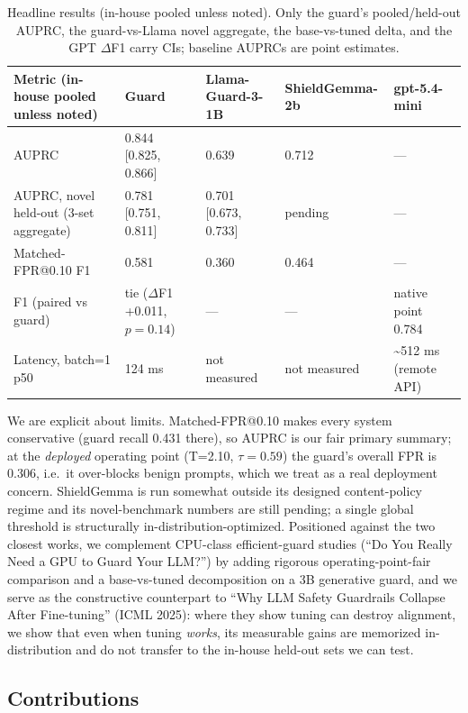 \documentclass[sigconf,nonacm]{acmart}
\begin{document}
\begin{table}[t]
  \centering
  \small
  \caption{Headline results (in-house pooled unless noted). Only the guard's pooled/held-out AUPRC, the guard-vs-Llama novel aggregate, the base-vs-tuned delta, and the GPT $\Delta$F1 carry CIs; baseline AUPRCs are point estimates.}
  \label{tab:headline}
  \begin{tabular}{lllll}
    \toprule
    Metric (in-house pooled unless noted) & Guard & Llama-Guard-3-1B & ShieldGemma-2b & gpt-5.4-mini \\
    \midrule
    AUPRC & 0.844 [0.825, 0.866] & 0.639 & 0.712 & --- \\
    AUPRC, novel held-out (3-set aggregate) & 0.781 [0.751, 0.811] & 0.701 [0.673, 0.733] & pending & --- \\
    Matched-FPR@0.10 F1 & 0.581 & 0.360 & 0.464 & --- \\
    F1 (paired vs guard) & tie ($\Delta$F1 +0.011, $p=0.14$) & --- & --- & native point 0.784 \\
    Latency, batch=1 p50 & 124 ms & not measured & not measured & \textasciitilde{}512 ms (remote API) \\
    \bottomrule
  \end{tabular}
\end{table}

We are explicit about limits. Matched-FPR@0.10 makes every system conservative (guard recall 0.431 there), so AUPRC is our fair primary summary; at the \emph{deployed} operating point (T=2.10, $\tau=0.59$) the guard's overall FPR is 0.306, i.e.\ it over-blocks benign prompts, which we treat as a real deployment concern. ShieldGemma is run somewhat outside its designed content-policy regime and its novel-benchmark numbers are still pending; a single global threshold is structurally in-distribution-optimized. Positioned against the two closest works, we complement CPU-class efficient-guard studies (``Do You Really Need a GPU to Guard Your LLM?'') by adding rigorous operating-point-fair comparison and a base-vs-tuned decomposition on a 3B generative guard, and we serve as the constructive counterpart to ``Why LLM Safety Guardrails Collapse After Fine-tuning'' (ICML 2025): where they show tuning can destroy alignment, we show that even when tuning \emph{works}, its measurable gains are memorized in-distribution and do not transfer to the in-house held-out sets we can test.

\subsection{Contributions}
\end{document}
